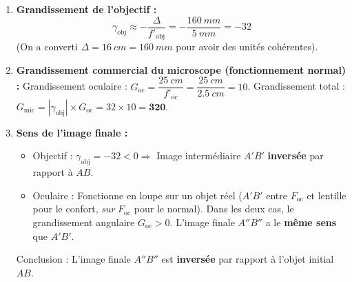 \documentclass[11pt]{article}
\begin{document}
\begin{exoresolu}
\begin{enumerate}
    \item \textbf{Grandissement de l'objectif :}
    \[
    \gamma_{\text{obj}} \approx -\frac{\Delta}{f'_{\text{obj}}} = -\frac{\SI{160}{mm}}{\SI{5}{mm}} = -32
    \]
    (On a converti $\Delta = \SI{16}{cm} = \SI{160}{mm}$ pour avoir des unités cohérentes).
    
    \item \textbf{Grandissement commercial du microscope (fonctionnement normal) :}
    Grandissement oculaire : $G_{\text{oc}} = \dfrac{\SI{25}{cm}}{f'_{\text{oc}}} = \dfrac{\SI{25}{cm}}{\SI{2,5}{cm}} = 10$.
    Grandissement total : $G_{\text{mic}} = |\gamma_{\text{obj}}| \times G_{\text{oc}} = 32 \times 10 = \mathbf{320}$.
    
    \item \textbf{Sens de l'image finale :}
    \begin{itemize}
        \item Objectif : $\gamma_{\text{obj}} = -32 < 0 \Rightarrow$ Image intermédiaire $A'B'$ \textbf{inversée} par rapport à $AB$.
        \item Oculaire : Fonctionne en loupe sur un objet réel ($A'B'$ entre $F_{\text{oc}}$ et lentille pour le confort, \emph{sur} $F_{\text{oc}}$ pour le normal). Dans les deux cas, le grandissement angulaire $G_{\text{oc}} > 0$. L'image finale $A''B''$ a le \textbf{même sens} que $A'B'$.
    \end{itemize}
    Conclusion : L'image finale $A''B''$ est \textbf{inversée} par rapport à l'objet initial $AB$.
\end{enumerate}
\end{exoresolu}
\end{document}
